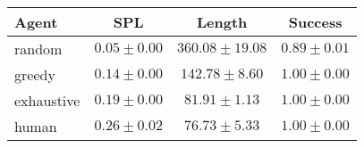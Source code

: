 \begin{tabular}{lccc}
    \toprule
    Agent & SPL & Length & Success \\
    \midrule
    random & $0.05 \pm 0.00$ & $360.08 \pm 19.08$ & $0.89 \pm 0.01$\\
    greedy & $0.14 \pm 0.00$ & $142.78 \pm 8.60$ & $1.00 \pm 0.00$\\
    exhaustive & $0.19 \pm 0.00$ & $81.91 \pm 1.13$ & $1.00 \pm 0.00$\\
    human & $0.26 \pm 0.02$ & $76.73 \pm 5.33$ & $1.00 \pm 0.00$\\
    \bottomrule
\end{tabular}